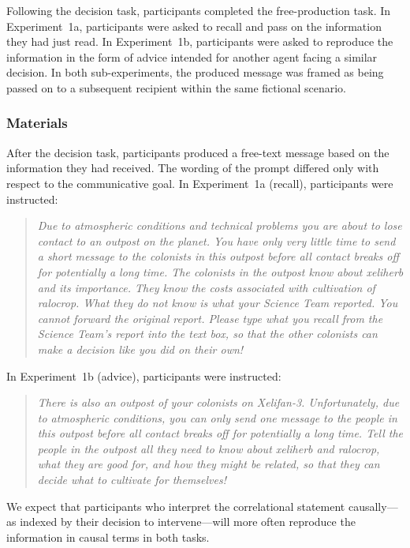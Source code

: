 \documentclass[10pt,letterpaper]{article}
\newcommand{\mf}[1]{\textcolor{BrickRed}{[MF: #1]}}
\begin{document}
Following the decision task, participants completed the free-production task. In Experiment~1a, participants were asked to recall and pass on the information they had just read. In Experiment~1b, participants were asked to reproduce the information in the form of advice intended for another agent facing a similar decision. In both sub-experiments, the produced message was framed as being passed on to a subsequent recipient within the same fictional scenario.

\subsubsection{Materials}

After the decision task, participants produced a free-text message based on the information they had received. The wording of the prompt differed only with respect to the communicative goal. In Experiment~1a (recall), participants were instructed: %
%
\begin{quote}
\small
\emph{Due to atmospheric conditions and technical problems you are about to lose contact to an outpost on the planet. You have only very little time to send a short message to the colonists in this outpost before all contact breaks off for potentially a long time. The colonists in the outpost know about xeliherb and its importance. They know the costs associated with cultivation of ralocrop. What they do not know is what your Science Team reported. You cannot forward the original report. Please type what you recall from the Science Team's report into the text box, so that the other colonists can make a decision like you did on their own!}
\end{quote}
%
In Experiment~1b (advice), participants were instructed:
%
\begin{quote}
\small
\emph{There is also an outpost of your colonists on Xelifan-3. Unfortunately, due to atmospheric conditions, you can only send one message to the people in this outpost before all contact breaks off for potentially a long time. Tell the people in the outpost all they need to know about xeliherb and ralocrop, what they are good for, and how they might be related, so that they can decide what to cultivate for themselves!}
\end{quote}
%
We expect that participants who interpret the correlational statement causally---as indexed by their decision to intervene---will more often reproduce the information in causal terms in both tasks.
\end{document}
